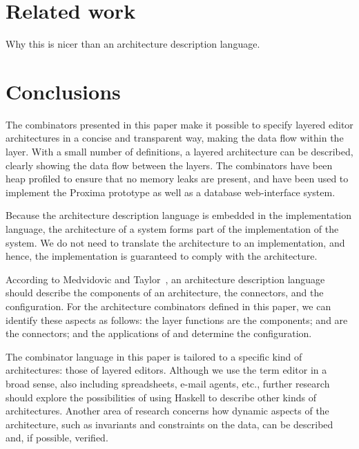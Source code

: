 \documentclass[preprint,natbib]{sigplanconf}
\begin{document}
%																
%																
%																
\section{Related work} \label{sect:relatedWork}

Why this is nicer than an architecture description language. 




%																
%																
%																
\section{Conclusions} \label{sect:conclusions}

The combinators presented in this paper make it possible to specify layered editor architectures in a concise and transparent way, making the data flow within the layer. With a small number of definitions, a layered architecture can be described, clearly showing the data flow between the layers. The combinators have been heap profiled to ensure that no memory leaks are present, and have been used to implement the Proxima prototype as well as a database web-interface system.

Because the architecture description language is embedded in the implementation language, the architecture of a system forms part of the implementation of the system. We do not need to translate the architecture to an implementation, and hence, the implementation is guaranteed to comply with the architecture.

According to Medvidovic and Taylor~\cite{medvidovic00ADLs}, an architecture description language should describe the components of an architecture, the connectors, and the configuration. For the architecture combinators defined in this paper, we can identify these aspects as follows: the layer functions are the components;  and  are the connectors; and the applications of  and  determine the configuration.

The combinator language in this paper is tailored to a specific kind of architectures: those of layered editors. Although we use the term editor in a broad sense, also including spreadsheets, e-mail agents, etc., further research should explore the possibilities of using Haskell to describe other kinds of architectures. Another area of research concerns how dynamic aspects of the architecture, such as invariants and constraints on the data, can be described and, if possible, verified.









\end{document}
